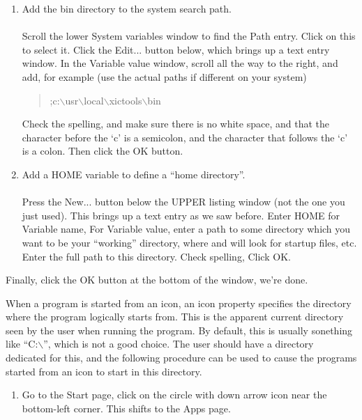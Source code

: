 \begin{itemize}
\begin{enumerate}
\item{Add the {\XicTools} {\vt bin} directory  to the system search path.\\\\
Scroll the lower {\cb System variables} window to find the {\vt Path}
entry.  Click on this to select it.  Click the {\cb Edit...} button
below, which brings up a text entry window.  In the {\cb Variable
value} window, scroll all the way to the right, and add, for example
(use the actual paths if different on your system)
\begin{quote}\vt
;c:$\backslash$usr$\backslash$local$\backslash$xictools$\backslash$bin
\end{quote}
Check the spelling, and make sure there is no white space, and that
the character before the `{\vt c}' is a semicolon, and the character
that follows the `{\vt c}' is a colon.  Then click the {\cb OK}
button.}

\item{Add a {\vt HOME} variable to define a ``home directory''.\\\\
Press the {\cb New...} button below the UPPER listing window (not the
one you just used).  This brings up a text entry as we saw before. 
Enter {\vt HOME} for {\cb Variable name}, For {\cb Variable value},
enter a path to some directory which you want to be your ``working''
directory, where {\Xic} and {\WRspice} will look for startup files,
etc.  Enter the full path to this directory.  Check spelling, Click
{\cb OK}.}
\end{enumerate}

Finally, click the {\cb OK} button at the bottom of the window, we're
done.

When a program is started from an icon, an icon property specifies the
directory where the program logically starts from.  This is the
apparent current directory seen by the user when running the program. 
By default, this is usually sonething like ``{\vt C:$\backslash$}'',
which is not a good choice.  The user should have a directory
dedicated for this, and the following procedure can be used to cause
the programs started from an icon to start in this directory.

\begin{enumerate}
\item{Go to the {\cb Start} page, click on the circle with down arrow
icon near the bottom-left corner.  This shifts to the {\cb Apps} page.}


\end{enumerate}
\end{itemize}
